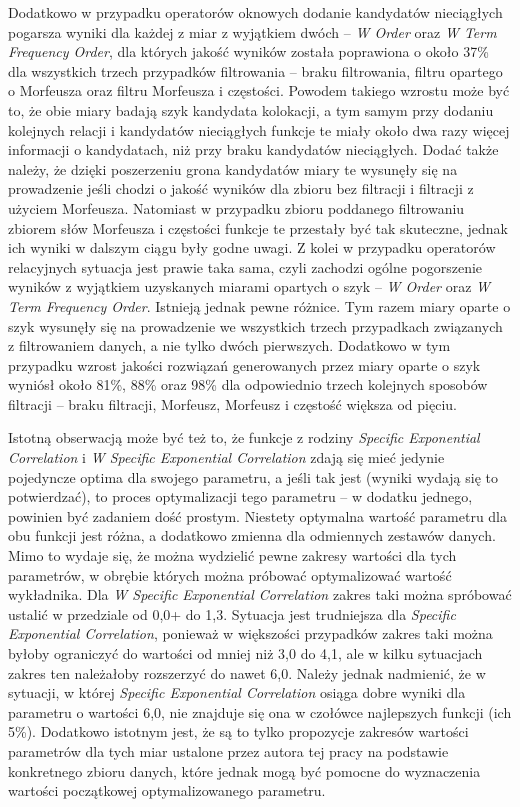 \par
Dodatkowo w przypadku operatorów oknowych dodanie kandydatów nieciągłych pogarsza wyniki dla każdej z miar z wyjątkiem dwóch -- \emph{W Order} oraz \emph{W Term Frequency Order}, dla których jakość wyników została poprawiona o około 37\% dla wszystkich trzech przypadków filtrowania -- braku filtrowania, filtru opartego o Morfeusza oraz filtru Morfeusza i częstości.
Powodem takiego wzrostu może być to, że obie miary badają szyk kandydata kolokacji, a tym samym przy dodaniu kolejnych relacji i kandydatów nieciągłych funkcje te miały około dwa razy więcej informacji o kandydatach, niż przy braku kandydatów nieciągłych.
Dodać także należy, że dzięki poszerzeniu grona kandydatów miary te wysunęły się na prowadzenie jeśli chodzi o jakość wyników dla zbioru bez filtracji i filtracji z użyciem Morfeusza.
Natomiast w przypadku zbioru poddanego filtrowaniu zbiorem słów Morfeusza i częstości funkcje te przestały być tak skuteczne, jednak ich wyniki w dalszym ciągu były godne uwagi.
Z kolei w przypadku operatorów relacyjnych sytuacja jest prawie taka sama, czyli zachodzi ogólne pogorszenie wyników z wyjątkiem uzyskanych miarami opartych o szyk -- \emph{W Order} oraz \emph{W Term Frequency Order}.
Istnieją jednak pewne różnice.
Tym razem miary oparte o szyk wysunęły się na prowadzenie we wszystkich trzech przypadkach związanych z filtrowaniem danych, a nie tylko dwóch pierwszych.
Dodatkowo w tym przypadku wzrost jakości rozwiązań generowanych przez miary oparte o szyk wyniósł około 81\%, 88\% oraz 98\% dla odpowiednio trzech kolejnych sposobów filtracji -- braku filtracji, Morfeusz, Morfeusz i częstość większa od pięciu.

\par
Istotną obserwacją może być też to, że funkcje z rodziny \emph{Specific Exponential Correlation} i \emph{W Specific Exponential Correlation} zdają się mieć jedynie pojedyncze optima dla swojego parametru, a jeśli tak jest (wyniki wydają się to potwierdzać), to proces optymalizacji tego parametru -- w dodatku jednego, powinien być zadaniem dość prostym.
Niestety optymalna wartość parametru dla obu funkcji jest różna, a dodatkowo zmienna dla odmiennych zestawów danych.
Mimo to wydaje się, że można wydzielić pewne zakresy wartości dla tych parametrów, w obrębie których można próbować optymalizować wartość wykładnika.
Dla \emph{W Specific Exponential Correlation} zakres taki można spróbować ustalić w przedziale od 0,0+ do 1,3.
Sytuacja jest trudniejsza dla \emph{Specific Exponential Correlation}, ponieważ w większości przypadków zakres taki można byłoby ograniczyć do wartości od mniej niż 3,0 do 4,1, ale w kilku sytuacjach zakres ten należałoby rozszerzyć do nawet 6,0.
Należy jednak nadmienić, że w sytuacji, w której \emph{Specific Exponential Correlation} osiąga dobre wyniki dla parametru o wartości 6,0, nie znajduje się ona w czołówce najlepszych funkcji (ich 5\%).
Dodatkowo istotnym jest, że są to tylko propozycje zakresów wartości parametrów dla tych miar ustalone przez autora tej pracy na podstawie konkretnego zbioru danych, które jednak mogą być pomocne do wyznaczenia wartości początkowej optymalizowanego parametru.

